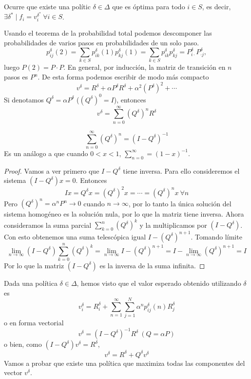 \documentclass[MIOP.tex]{subfiles}
\begin{document}
\begin{observacion}
Ocurre que existe una polític $\delta\in\Delta$ que es óptima para todo $i\in S$, es decir, $\exists \delta^*\mid f_i=v_i^{\delta^*}\ \forall i\in S$.
\end{observacion}
\begin{observacion}
Usando el teorema de la probabilidad total podemos descomponer las probabilidades de varios pasos en probabilidades de un solo paso.
$$p_{ij}^\delta(2)=\sum_{k\in S}p_{ik}^\delta(1)p_{kj}^\delta(1)=\sum_{k\in S}p_{ik}^\delta p_{kj}^\delta=P^\delta_{i\cdot}P^\delta_{\cdot j},$$
luego $P(2)=P\cdot P$. En general, por inducción, la matriz de transición en $n$ pasos es $P^n$. De esta forma podemos escribir de modo más compacto
$$v^\delta=R^\delta+ \alpha P^\delta R^\delta +\alpha^2 (P^\delta)^2+\cdots$$
Si denotamos $Q^\delta=\alpha P^\delta$ ($(Q^\delta)^0=I$), entonces
$$v^\delta=\sum_{n=0}^\infty (Q^\delta)^n R^\delta$$
\end{observacion}

\begin{lemma}
$$\sum_{n=0}^\infty (Q^\delta)^n=(I-Q^\delta)^{-1}$$
Es un análogo a que cuando $0<x<1$, $\sum_{n=0}^\infty=(1-x)^{-1}$. 
\end{lemma}
\begin{proof}
Vamos a ver primero que $I-Q^\delta$ tiene inversa. Para ello consideremos el sistema $(I-Q^\delta)x=0$. Entonces
$$Ix=Q^\delta x=(Q^\delta)^2x=\cdots=(Q^\delta)^nx\ \forall n$$
Pero $(Q^\delta)^n=\alpha^n P^n\to 0$ cuando $n\to\infty$, por lo tanto la única solución del sistema homogéneo es la solución nula, por lo que la matriz tiene inversa. Ahora consideramos la suma parcial $\sum_{k=0}^n (Q^\delta)^k$ y la multiplicamos por $(I-Q^\delta)$. Con esto obtenemos una suma telescópica igual $I-(Q^\delta)^{n+1}$. Tomando límite
$$\lim_{n\to\infty}(I-Q^\delta)\sum_{k=0}^n (Q^\delta)^k=\lim_{n\to\infty}I-(Q^\delta)^{n+1}=I-\lim_{n\to\infty}(Q^\delta)^{n+1}=I$$
Por lo que la matriz $(I-Q^\delta)$ es la inversa de la suma infinita.
\end{proof}

Dada una política $\delta\in\Delta$, hemos visto que el valor esperado obtenido utilizando $\delta$ es
$$v_i^\delta=R^\delta_i+\sum_{n=1}^\infty\sum_{j=1}^N\alpha^n p_{ij}^\delta(n) R_j^\delta$$
o en forma vectorial
$$v^\delta=(I-Q^\delta)^{-1}R^\delta\ (Q=\alpha P)$$
o bien, como $(I-Q^\delta)v^\delta=R^\delta$,
$$v^\delta=R^\delta+Q^\delta v^\delta$$
Vamos a probar que existe una política que maximiza todas las componentes del vector $v^\delta$.
\end{document}
